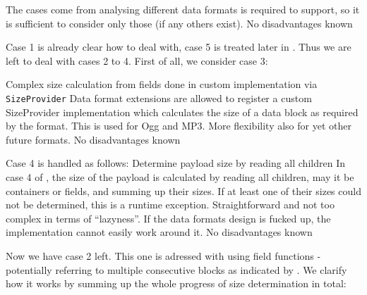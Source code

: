 {%
The cases come from analysing different data formats \LibName{} is required to support, so it is sufficient to consider only those (if any others exist).
}
{%
No disadvantages known
}

Case 1 is already clear how to deal with, case 5 is treated later in . Thus we are left to deal with cases 2 to 4. First of all, we consider case 3:

{%
Complex size calculation from fields done in custom implementation via \texttt{SizeProvider}
}
{%
Data format extensions are allowed to register a custom SizeProvider implementation which calculates the size of a data block as required by the format. This is used for Ogg and MP3.
}
{%
More flexibility also for yet other future formats.
}
{%
No disadvantages known
}

Case 4 is handled as follows:
{%
Determine payload size by reading all children
}
{%
In case 4 of , the size of the payload is calculated by reading all children, may it be containers or fields, and summing up their sizes. If at least one of their sizes could not be determined, this is a runtime exception.
}
{%
Straightforward and not too complex in terms of ``lazyness''. If the data formats design is fucked up, the implementation cannot easily work around it.
}
{%
No disadvantages known
}

Now we have case 2 left. This one is adressed with using field functions - potentially referring to multiple consecutive blocks as indicated by . We clarify how it works by summing up the whole progress of size determination in total:

